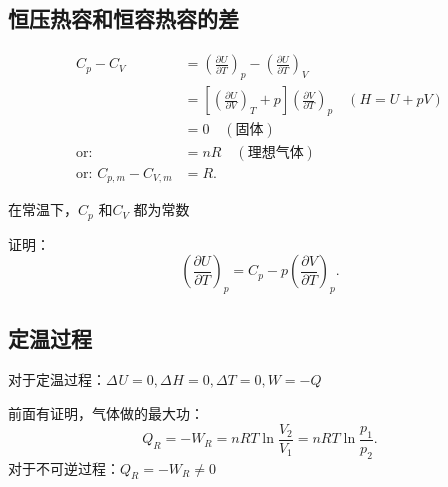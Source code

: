 \subsection{恒压热容和恒容热容的差}%
\label{sub:恒压热容和恒容热容的差}
\begin{align*}
    C_{p}-C_{V} &= \left(\frac{\partial U}{\partial T}\right)_{p} - \left(\frac{\partial U}{\partial T}\right)_{V} \\
    &= \left[ \left(\frac{\partial U}{\partial V}\right)_{T}+p \right]\left(\frac{\partial V}{\partial T}\right)_{p} \quad \left( H=U+pV \right)\\
    &= 0\quad \left( \text{固体} \right)\\
    \text{or: }&= nR \quad \left( \text{理想气体} \right)\\
    \text{or: }C_{p,m}-C_{V,m} &= R 
.\end{align*}
\begin{notation}
在常温下，$C_{p}$ 和$C_{V}$ 都为常数
\end{notation}
\begin{eg}
证明：\[
    \left(\frac{\partial U}{\partial T}\right)_{p} = C_{p} - p\left(\frac{\partial V}{\partial T}\right)_{p}
.\]
\end{eg}
\subsection{定温过程}%
\label{sub:定温过程}
对于定温过程：$\Delta_\text{}U =0,\Delta_\text{}H=0, \Delta T =0 ,W=-Q$

前面有证明，气体做的最大功：\[
    Q_R = -W_R = nRT \ln \frac{V_2}{V_1} = nRT \ln \frac{p_1}{p_2}
.\]
对于不可逆过程：$Q_R = -W_R \neq 0$
